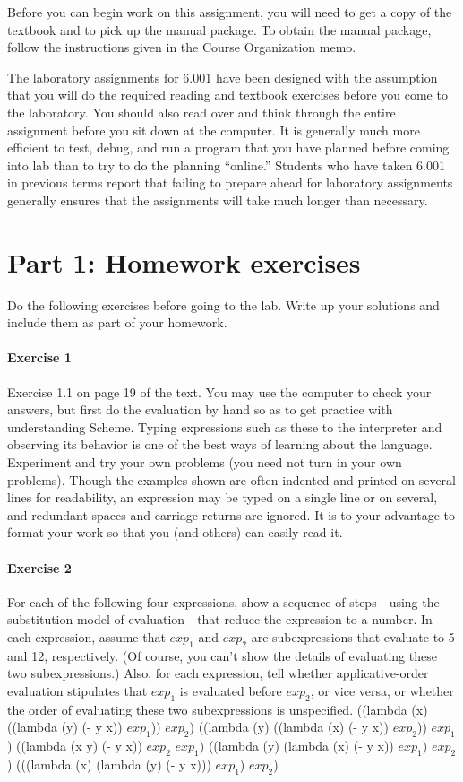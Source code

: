 Before you can begin work on this assignment, you will need to get a copy of
the textbook and to pick up the manual package.  To obtain the manual package,
follow the instructions given in the Course Organization memo.

The laboratory assignments for 6.001 have been designed with the
assumption that you will do the required reading and textbook
exercises before you come to the laboratory.  You should also read
over and think through the entire assignment before you sit down at
the computer.  It is generally much more efficient to test, debug, and
run a program that you have planned before coming into lab than to try
to do the planning ``online.''  Students who have taken 6.001 in
previous terms report that failing to prepare ahead for laboratory
assignments generally ensures that the assignments will take much
longer than necessary.


\section{Part 1: Homework exercises}

Do the following exercises before going to the lab.  Write up your
solutions and include them as part of your homework.

\paragraph{Exercise 1}
Exercise 1.1 on page 19 of the text.  You may use the computer to check your
answers, but first do the evaluation by hand so as to get practice with
understanding Scheme.  Typing expressions such as these to the interpreter and
observing its behavior is one of the best ways of learning about the language.
Experiment and try your own problems (you need not turn in your own problems).
Though the examples shown are often indented and printed on several lines for
readability, an expression may be typed on a single line or on several, and
redundant spaces and carriage returns are ignored.  It is to your advantage to
format your work so that you (and others) can easily read it.


\paragraph{Exercise 2}
For each of the following four expressions, show a sequence of
steps---using the substitution model of evaluation---that reduce the
expression to a number.  In each expression, assume that $exp_1$
and $exp_2$ are subexpressions that evaluate to 5 and 12,
respectively.  (Of course, you can't show the details of evaluating
these two subexpressions.)  Also, for each expression, tell whether
applicative-order evaluation stipulates that $exp_1$ is evaluated
before $exp_2$, or vice versa, or whether the order of evaluating
these two subexpressions is unspecified.
\beginlisp
((lambda (x) ((lambda (y) (- y x)) $exp_1$)) $exp_2$)
\null
((lambda (y) ((lambda (x) (- y x)) $exp_2$)) $exp_1$)
\null
((lambda (x y) (- y x)) $exp_2$ $exp_1$)
\null
((lambda (y) (lambda (x) (- y x)) $exp_1$) $exp_2$)
\null
(((lambda (x) (lambda (y) (- y x))) $exp_1$) $exp_2$)
\endlisp

